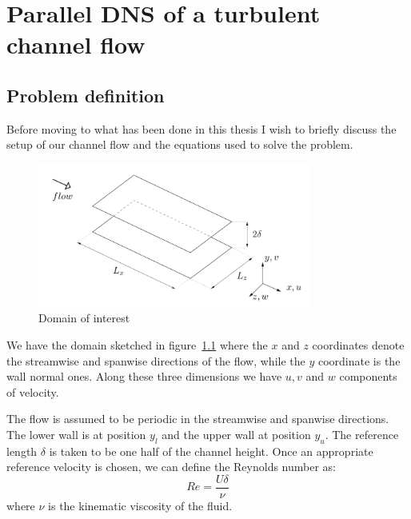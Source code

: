 \chapter{Parallel DNS of a turbulent channel flow}


\section{Problem definition}
\pagestyle{headings}

Before moving to what has been done in this thesis I wish to briefly discuss the setup of our channel flow and the equations used to solve the problem.

\begin{figure}[h]
\centering
\includegraphics[width=0.8\textwidth]{grafici/sketch_dominio}
\caption{Domain of interest}
\label{sketch_dominio}
\end{figure}

We have the domain sketched in figure~\ref{sketch_dominio} where the $x$ and $z$ coordinates denote the streamwise and spanwise directions of the flow, while the $y$ coordinate is the wall normal ones.
Along these three dimensions we have $u,v$ and $w$ components of velocity.

The flow is assumed to be periodic in the streamwise and spanwise directions. The lower wall is at position $y_l$ and the upper wall at position $y_u$. The reference length $\delta$ is taken to be one half of the channel height.
Once an appropriate reference velocity is chosen, we can define the Reynolds number as:
\[
Re = \frac{U\delta}{\nu}
\]
where $\nu$ is the kinematic viscosity of the fluid.

